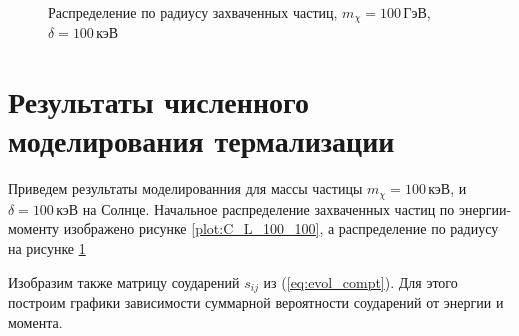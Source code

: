 \begin{figure}[!h]
	\begin{center}
		\caption{Распределение по радиусу захваченных частиц, $m_{\chi} = 100 \,  \text{ГэВ}$, $\delta = 100 \, \text{кэВ}$}
		\label{plot:r_distrib_100_100}
	\end{center}	
\end{figure}

\section{Результаты численного моделирования термализации}

Приведем результаты моделированния для массы частицы $m_{\chi} = 100 \, \text{кэВ}$, и $\delta = 100 \, \text{кэВ}$ на Солнце. Начальное распределение захваченных частиц по энергии-моменту изображено рисунке \ref{plot:C_L_100_100}, а распределение по радиусу на рисунке \ref{plot:r_distrib_100_100}

Изобразим также матрицу соударений $s_{ij}$ из (\ref{eq:evol_compt}). Для этого построим графики зависимости суммарной вероятности соударений от энергии и момента.


